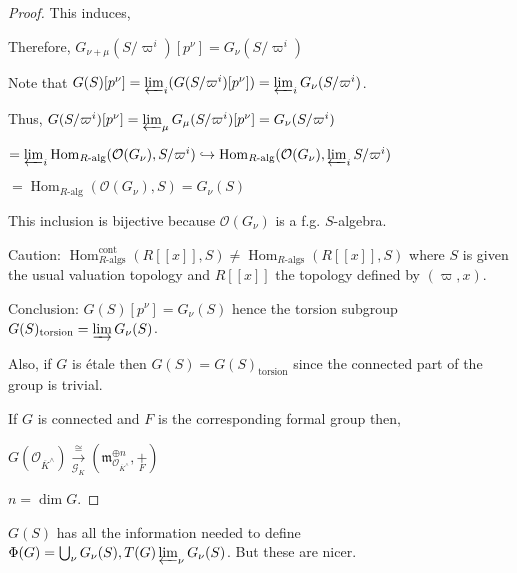 \documentclass{article}
\theoremstyle{definition}
\numberwithin{theorem}{subsection}
\begin{document}
\begin{proof}
        This induces,

        \begin{center}
        \end{center}

        Therefore, \(G_{\nu+\mu}(S / \varpi^i)[p^\nu] = G_\nu(S / \varpi^i)\)
        
        Note that \(G(S)[p^\nu] =  \varprojlim_i (G(S / \varpi^i)[p^\nu]) = \varprojlim_i G_\nu(S / \varpi^i)\).
        
        Thus, \(G(S / \varpi^i)[p^\nu] = \varprojlim_\mu G_{\mu} (S / \varpi^i)[p^\nu] = G_\nu(S / \varpi^i)\)
        
        \(= \varprojlim_i \operatorname{Hom}_{R\text{-alg}}(\mathcal{O}(G_\nu), S / \varpi^i) \hookrightarrow \operatorname{Hom}_{R\text{-alg}}(\mathcal{O}(G_\nu), \varprojlim_i S / \varpi^i)\)
        
        \(= \operatorname{Hom}_{R\text{-alg}}(\mathcal{O}(G_\nu),S) = G_\nu(S)\)
        
        This inclusion is bijective because \(\mathcal{O} (G_\nu)\) is a f.g. \(S\)-algebra. 

        Caution: \(\operatorname{Hom}_{R \text{-algs}}^{\text{cont}} (R[[x]], S) \neq \operatorname{Hom}_{R\text{-algs}}(R[[x]], S)\) where \(S\) is given the usual valuation topology and \(R[[x]]\) the topology defined by \((\varpi, x)\).
        
        Conclusion: \(G(S)[p^\nu] = G_\nu(S)\) hence the torsion subgroup \(G(S)_{\text{torsion}} = \varinjlim G_\nu(S)\).

        Also, if \(G\) is \'etale then \(G(S) = G(S)_{\text{torsion}}\) since the connected part of the group is trivial.
        
        If \(G\) is connected and \(F\) is the corresponding formal group then,
        
        \(G(\mathcal{O}_{\overline{K}^\wedge}) \xrightarrow[\mathscr{G}_K]{\cong} \left( \mathfrak{m}_{\mathcal{O}_{\overline{K}^\wedge}}^{\oplus n}, \underset{F}{+} \right) \)
        
        \(n = \dim G\).
    \end{proof}

    \(G(S)\) has all the information needed to define \(\Phi(G) = \bigcup_\nu G_\nu(S), T(G) \varprojlim_\nu G_\nu(S)\). But these are nicer.
\end{document}
